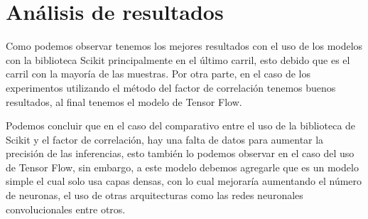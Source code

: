 \section{Análisis de resultados}

Como podemos observar tenemos los mejores resultados con el uso de los modelos con la biblioteca Scikit principalmente en el último carril, esto debido que es el carril con la mayoría de las muestras. Por otra parte, en el caso de los experimentos utilizando el método del factor de correlación tenemos buenos resultados, al final tenemos el modelo de Tensor Flow.

Podemos concluir que en el caso del comparativo entre el uso de la biblioteca de Scikit y el factor de correlación, hay una falta de datos para aumentar la precisión de las inferencias, esto también lo podemos observar en el caso del uso de Tensor Flow, sin embargo, a este modelo debemos agregarle que es un modelo simple el cual solo usa capas densas, con lo cual mejoraría aumentando el número de neuronas, el uso de otras arquitecturas como las redes neuronales convolucionales entre otros.
